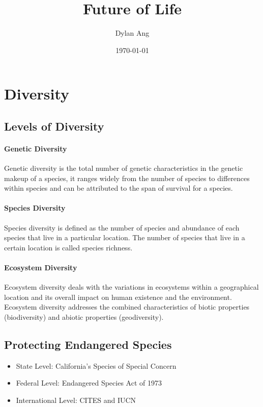 \documentclass[12pt]{article}
\title{Future of Life}
\author{Dylan Ang}
\date{\today}
\begin{document}
\maketitle

\tableofcontents

\section{Diversity}

\subsection{Levels of Diversity}

\paragraph{Genetic Diversity}
Genetic diversity is the total number of genetic characteristics in the genetic makeup of a species, it ranges widely from the number of species to differences within species and can be attributed to the span of survival for a species.

\paragraph{Species Diversity}
Species diversity is defined as the number of species and abundance of each species that live in a particular location. The number of species that live in a certain location is called species richness.

\paragraph{Ecosystem Diversity}
Ecosystem diversity deals with the variations in ecosystems within a geographical location and its overall impact on human existence and the environment. Ecosystem diversity addresses the combined characteristics of biotic properties (biodiversity) and abiotic properties (geodiversity).

\subsection{Protecting Endangered Species}

\begin{itemize}
    \item State Level: California's Species of Special Concern
    \item Federal Level: Endangered Species Act of 1973
    \item International Level: CITES and IUCN
\end{itemize}
\end{document}

